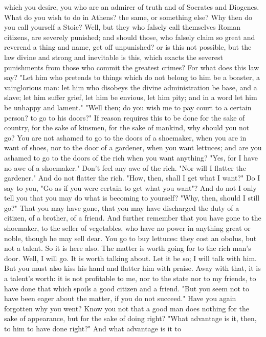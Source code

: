 \documentclass[a4paper]{article}
\begin{document}
which you desire, you who are an admirer of truth and of Socrates and Diogenes.
What do you wish to do in Athens? the same, or something else? Why then do you
call yourself a Stoic? Well, but they who falsely call themselves Roman
citizens, are severely punished; and should those, who falsely claim so great
and reverend a thing and name, get off unpunished? or is this not possible, but
the law divine and strong and inevitable is this, which exacts the severest
punishments from those who commit the greatest crimes? For what does this law
say? "Let him who pretends to things which do not belong to him be a boaster, a
vainglorious man: let him who disobeys the divine administration be base, and a
slave; let him suffer grief, let him be envious, let him pity; and in a word
let him be unhappy and lament."
    "Well then; do you wish me to pay court to a certain person? to go to his
doors?" If reason requires this to be done for the sake of country, for the
sake of kinsmen, for the sake of mankind, why should you not go? You are not
ashamed to go to the doors of a shoemaker, when you are in want of shoes, nor
to the door of a gardener, when you want lettuces; and are you ashamed to go to
the doors of the rich when you want anything? "Yes, for I have no awe of a
shoemaker." Don't feel any awe of the rich. "Nor will I flatter the gardener."
And do not flatter the rich. "How, then, shall I get what I want?" Do I say to
you, "Go as if you were certain to get what you want"? And do not I only tell
you that you may do what is becoming to yourself? "Why, then, should I still
go?" That you may have gone, that you may have discharged the duty of a
citizen, of a brother, of a friend. And further remember that you have gone to
the shoemaker, to the seller of vegetables, who have no power in anything great
or noble, though he may sell dear. You go to buy lettuces: they cost an obolus,
but not a talent. So it is here also. The matter is worth going for to the rich
man's door. Well, I will go. It is worth talking about. Let it be so; I will
talk with him. But you must also kiss his hand and flatter him with praise.
Away with that, it is a talent's worth: it is not profitable to me, nor to the
state nor to my friends, to have done that which spoils a good citizen and a
friend. "But you seem not to have been eager about the matter, if you do not
succeed." Have you again forgotten why you went? Know you not that a good man
does nothing for the sake of appearance, but for the sake of doing right? "What
advantage is it, then, to him to have done right?" And what advantage is it to
\end{document}
